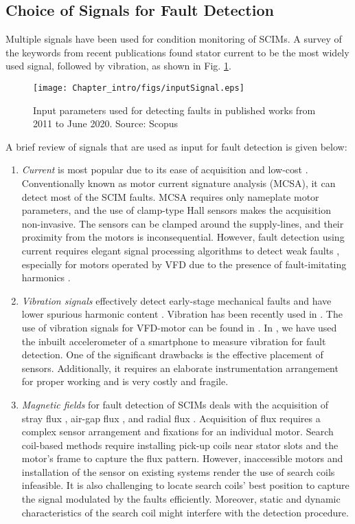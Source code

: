 \subsection{Choice of Signals for Fault Detection}
%
Multiple signals have been used for condition monitoring of SCIMs. A survey of the keywords from recent publications found stator current to be the most widely used signal, followed by vibration, as shown in Fig. \ref{Fig:inputSignal}.
\begin{figure}[h] \centering
	{\texttt{[image: Chapter\_intro/figs/inputSignal.eps]}} \caption{Input parameters used for detecting faults in published works from 2011 to June 2020. Source: Scopus} \label{Fig:inputSignal}
\end{figure}
A brief review of signals that are used as input for fault detection is given below:
\begin{enumerate}
	\renewcommand{\theenumi}{\roman{enumi}}
		\item \emph{Current} is most popular due to its ease of acquisition and low-cost \cite{garcia2019approach, pandarakone2018evaluating}. Conventionally known as motor current signature analysis (MCSA), it can detect most of the SCIM faults.  MCSA requires only nameplate motor parameters, and the use of clamp-type Hall sensors makes the acquisition non-invasive. The sensors can be clamped around the supply-lines, and their proximity from the motors is inconsequential. However, fault detection using current requires elegant signal processing algorithms to detect weak faults \cite{Zhou2009}, especially for motors operated by VFD due to the presence of fault-imitating harmonics \cite{Soualhi2013}. 
%		
		\item \emph{Vibration signals} effectively detect early-stage mechanical faults and have lower spurious harmonic content \cite{corne2015comparing}. Vibration has been recently used in \cite{shao2018highly, xie2019electromagnetic, contreras2019quaternion, pan2016fault}. The use of vibration signals for VFD-motor can be found in \cite{delgado2015comparative}. In \cite{naha2017mobile}, we have used the inbuilt accelerometer of a smartphone to measure vibration for fault detection. One of the significant drawbacks is the effective placement of sensors. Additionally, it requires an elaborate instrumentation arrangement for proper working and is very costly and fragile.
%		
		\item \emph{Magnetic fields} for fault detection of SCIMs deals with the acquisition of stray flux \cite{park2018stray}, air-gap flux \cite{soleimani2018broken}, and radial flux \cite{surya2016simplified}. Acquisition of flux requires a complex sensor arrangement and fixations for an individual motor. Search coil-based methods require installing pick-up coils near stator slots and the motor's frame to capture the flux pattern. However, inaccessible motors and installation of the sensor on existing systems render the use of search coils infeasible. It is also challenging to locate search coils' best position to capture the signal modulated by the faults efficiently. Moreover, static and dynamic characteristics of the search coil might interfere with the detection procedure. 

\end{enumerate}
